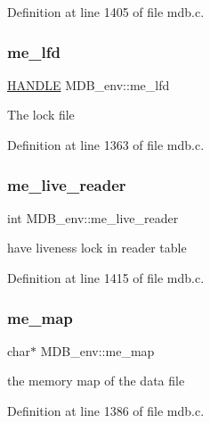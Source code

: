 Definition at line 1405 of file mdb.\+c.

\mbox{\label{struct_m_d_b__env_a74decfb0ded4cd870c8fafe0208abefc}} 
\subsubsection{\texorpdfstring{me\+\_\+lfd}{me\_lfd}}
{\footnotesize\ttfamily \mbox{\hyperlink{group__compat_gab521aa5010fb1afb801a899a55569e03}{H\+A\+N\+D\+LE}} M\+D\+B\+\_\+env\+::me\+\_\+lfd}

The lock file 

Definition at line 1363 of file mdb.\+c.

\mbox{\label{struct_m_d_b__env_ab0aee4c3cd1006e27d8d76c4634c742e}} 
\subsubsection{\texorpdfstring{me\+\_\+live\+\_\+reader}{me\_live\_reader}}
{\footnotesize\ttfamily int M\+D\+B\+\_\+env\+::me\+\_\+live\+\_\+reader}

have liveness lock in reader table 

Definition at line 1415 of file mdb.\+c.

\mbox{\label{struct_m_d_b__env_a58d7b9c0502757390c1631caa51cf96b}} 
\subsubsection{\texorpdfstring{me\+\_\+map}{me\_map}}
{\footnotesize\ttfamily char$\ast$ M\+D\+B\+\_\+env\+::me\+\_\+map}

the memory map of the data file 

Definition at line 1386 of file mdb.\+c.

\mbox{\label{struct_m_d_b__env_a98bb1536454549ec21407c4cf376a6dd}} 
